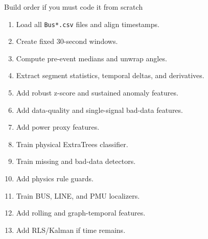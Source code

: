 \documentclass[10pt,aspectratio=169]{beamer}
\newcommand{\code}[1]{\texttt{\footnotesize #1}}
\begin{document}
\begin{frame}{Build order if you must code it from scratch}
\small
\begin{enumerate}
  \item Load all \code{Bus*.csv} files and align timestamps.
  \item Create fixed 30-second windows.
  \item Compute pre-event medians and unwrap angles.
  \item Extract segment statistics, temporal deltas, and derivatives.
  \item Add robust z-score and sustained anomaly features.
  \item Add data-quality and single-signal bad-data features.
  \item Add power proxy features.
  \item Train physical ExtraTrees classifier.
  \item Train missing and bad-data detectors.
  \item Add physics rule guards.
  \item Train BUS, LINE, and PMU localizers.
  \item Add rolling and graph-temporal features.
  \item Add RLS/Kalman if time remains.
\end{enumerate}
\end{frame}
\end{document}
